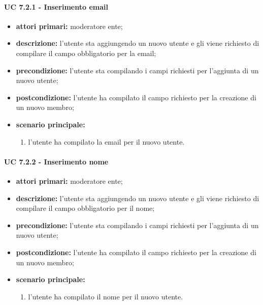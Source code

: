 			\paragraph{UC 7.2.1 - Inserimento email}
			\begin{itemize}
				\item \textbf{attori primari:} moderatore ente;
				\item \textbf{descrizione:} l'utente sta aggiungendo un nuovo utente e gli viene richiesto di compilare il campo obbligatorio per la email;
				\item \textbf{precondizione:} l'utente sta compilando i campi richiesti per l'aggiunta di un nuovo utente;
				\item \textbf{postcondizione:} l'utente ha compilato il campo richiesto per la creazione di un nuovo membro;
				\item \textbf{scenario principale:}
				\begin{enumerate}
					\item{l'utente ha compilato la email per il nuovo utente.}
				\end{enumerate}
			\end{itemize}

			\paragraph{UC 7.2.2 - Inserimento nome}
			\begin{itemize}
				\item \textbf{attori primari:} moderatore ente;
				\item \textbf{descrizione:} l'utente sta aggiungendo un nuovo utente e gli viene richiesto di compilare il campo obbligatorio per il nome;
				\item \textbf{precondizione:} l'utente sta compilando i campi richiesti per l'aggiunta di un nuovo utente;
				\item \textbf{postcondizione:} l'utente ha compilato il campo richiesto per la creazione di un nuovo membro;
				\item \textbf{scenario principale:}
				\begin{enumerate}
					\item{l'utente ha compilato il nome per il nuovo utente.}
				\end{enumerate}
			\end{itemize}

